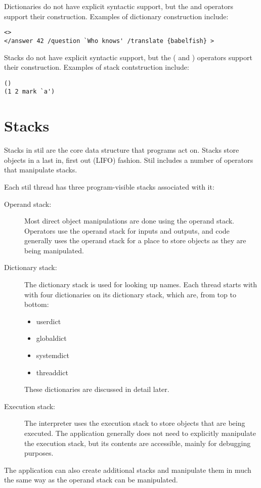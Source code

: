 Dictionaries do not have explicit syntactic support, but the {\lt} and
{\gt} operators support their construction.  Examples of dictionary
construction include:
\begin{verbatim}
<>
</answer 42 /question `Who knows' /translate {babelfish} >
\end{verbatim}

Stacks do not have explicit syntactic support, but the ( and ) operators support
their construction.  Examples of stack contstruction include:
\begin{verbatim}
()
(1 2 mark `a')
\end{verbatim}

\section{Stacks}

Stacks in stil are the core data structure that programs act on.  Stacks store
objects in a last in, first out (LIFO) fashion.  Stil includes a number of
operators that manipulate stacks.

Each stil thread has three program-visible stacks associated with it:
\begin{description}
\item[Operand stack: ] Most direct object manipulations are done using the
	operand stack.  Operators use the operand stack for inputs and outputs,
	and code generally uses the operand stack for a place to store objects
	as they are being manipulated.
\item[Dictionary stack: ] The dictionary stack is used for looking up names.
	Each thread starts with with four dictionaries on its dictionary stack,
	which are, from top to bottom:
	\begin{itemize}
	\item{userdict}
	\item{globaldict}
	\item{systemdict}
	\item{threaddict}
	\end{itemize}
	These dictionaries are discussed in detail later.
\item[Execution stack: ] The interpreter uses the execution stack to store
	objects that are being executed.  The application generally does not
	need to explicitly manipulate the execution stack, but its contents are
	accessible, mainly for debugging purposes.
\end{description}

The application can also create additional stacks and manipulate them in much
the same way as the operand stack can be manipulated.

